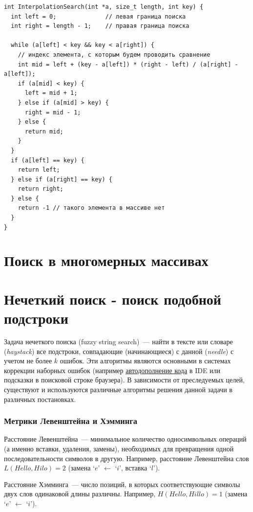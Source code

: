 \begin{verbatim}
int InterpolationSearch(int *a, size_t length, int key) {
  int left = 0;              // левая граница поиска
  int right = length - 1;    // правая граница поиска 

  while (a[left] < key && key < a[right]) {
    // индекс элемента, с которым будем проводить сравнение 
    int mid = left + (key - a[left]) * (right - left) / (a[right] - a[left]);
    if (a[mid] < key) {
      left = mid + 1;
    } else if (a[mid] > key) {
      right = mid - 1;
    } else {
      return mid;
    }
  }
  if (a[left] == key) {
    return left;
  } else if (a[right] == key) {
    return right;
  } else {
    return -1 // такого элемента в массиве нет
  }
}
\end{verbatim}

\section{Поиск в многомерных массивах}
\section{Нечеткий поиск - поиск подобной подстроки}
Задача нечеткого поиска (fuzzy string search)~--- найти в тексте или словаре (\textit{haystack}) все подстроки, совпадающие
(начинающиеся) с данной (\textit{needle}) с учетом не более \(k\) ошибок.
Эти алгоритмы являются основными в системах коррекции наборных ошибок
(например \href{https://en.wikipedia.org/wiki/Code_completion}{автодополнение кода} в IDE или подсказки в поисковой строке браузера).
В зависимости от преследуемых целей, существуют и используются различные алгоритмы решения данной задачи в различных постановках.

\subsubsection{Метрики Левенштейна и Хэмминга}
Расстояние Левенштейна~--- минимальное количество односимвольных операций (а именно вставки, удаления, замены),
необходимых для превращения одной последовательности символов в другую.
Например, расстояние Левенштейна слов \(L(Hello, Hilo) = 2\) (замена `\(e\)' \(\gets\) `\(i\)', вставка `\(l\)').

Расстояние Хэмминга~--- число позиций, в которых соответствующие символы двух слов одинаковой длины различны. Например,
\(H(Hello, Hillo) = 1\) (замена `\(e\)' \(\gets\) `\(i\)').

